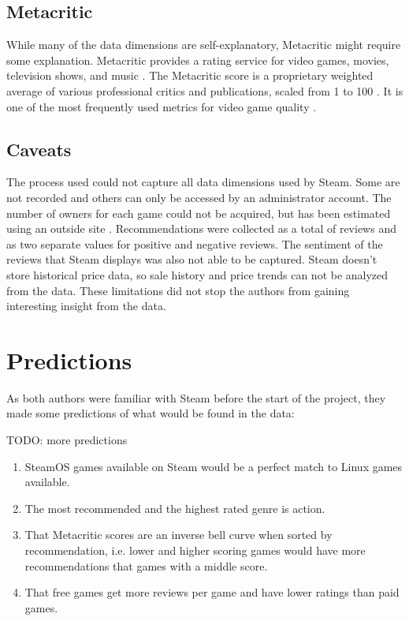 \documentclass[letterpaper,10pt,twocolumn]{article}
\begin{document}
\subsection{Metacritic}

While many of the data dimensions are self-explanatory, Metacritic might
require some explanation. Metacritic provides a rating service for video
games, movies, television shows, and music \cite{metacritic}. The Metacritic
score is a proprietary weighted average of various professional critics and
publications, scaled from 1 to 100 \cite{metacritic-score}. It is one of the
most frequently used metrics for video game quality \cite{metacritic-vgdominant}.


\subsection{Caveats}

The process used could not capture all data dimensions used by Steam. Some are
not recorded and others can only be accessed by an administrator account. The
number of owners for each game could not be acquired, but has been estimated
using an outside site \cite{steamspy}. Recommendations were collected as a
total of reviews and as two separate values for positive and negative reviews.
The sentiment of the reviews that Steam displays was also not able to be
captured. Steam doesn't store historical price data, so sale history and
price trends can not be analyzed from the data. These limitations did not stop
the authors from gaining interesting insight from the data.



\section{Predictions}

As both authors were familiar with Steam before the start of the project, they
made some predictions of what would be found in the data:

TODO: more predictions

\begin{enumerate}
    \item SteamOS games available on Steam would be a perfect match to Linux
    games available.

    \item The most recommended and the highest rated genre is action.

    \item That Metacritic scores are an inverse bell curve when sorted by
    recommendation, i.e. lower and higher scoring games would have more
    recommendations that games with a middle score.

    \item That free games get more reviews per game and have lower ratings than
    paid games.
\end{enumerate}
\end{document}
